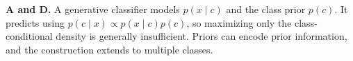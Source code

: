 \textbf{A and D.} A generative classifier models \(p(x\mid c)\) and the class prior \(p(c)\). It predicts using \(p(c\mid x)\propto p(x\mid c)p(c)\), so maximizing only the class-conditional density is generally insufficient. Priors can encode prior information, and the construction extends to multiple classes.

